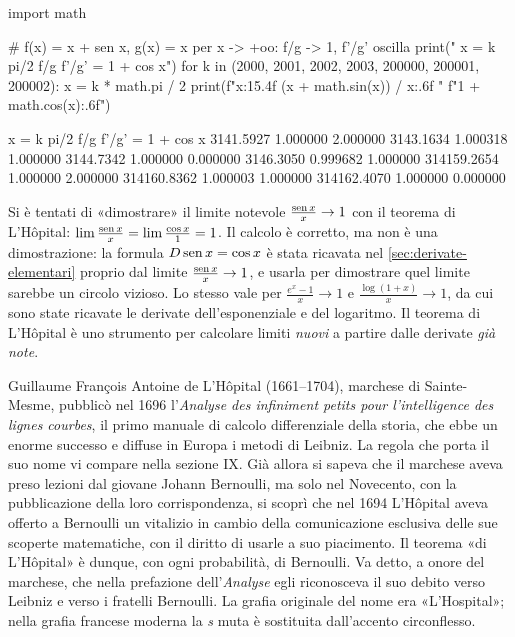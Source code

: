 \begin{python}
import math

# f(x) = x + sen x, g(x) = x per x -> +oo: f/g -> 1, f'/g' oscilla
print("     x = k pi/2        f/g     f'/g' = 1 + cos x")
for k in (2000, 2001, 2002, 2003, 200000, 200001, 200002):
    x = k * math.pi / 2
    print(f"{x:15.4f}   {(x + math.sin(x)) / x:.6f}   "
          f"{1 + math.cos(x):.6f}")
\end{python}
\begin{risultato}
     x = k pi/2        f/g     f'/g' = 1 + cos x
      3141.5927   1.000000   2.000000
      3143.1634   1.000318   1.000000
      3144.7342   1.000000   0.000000
      3146.3050   0.999682   1.000000
    314159.2654   1.000000   2.000000
    314160.8362   1.000003   1.000000
    314162.4070   1.000000   0.000000
\end{risultato}

\begin{attenzione}
Si è tentati di «dimostrare» il limite notevole $\frac{\operatorname{sen} x}{x}\to1$ con il teorema di
L'Hôpital: $\lim\frac{\operatorname{sen} x}{x}=\lim\frac{\cos x}{1}=1$. Il calcolo è corretto, ma non è
una dimostrazione: la formula $D\operatorname{sen} x=\cos x$ è stata ricavata nel
\cref{sec:derivate-elementari} proprio dal limite $\frac{\operatorname{sen} x}x\to1$, e usarla per
dimostrare quel limite sarebbe un circolo vizioso. Lo stesso vale per
$\frac{e^{x}-1}{x}\to1$ e $\frac{\log(1+x)}{x}\to1$, da cui sono state ricavate le
derivate dell'esponenziale e del logaritmo. Il teorema di L'Hôpital è uno strumento per
calcolare limiti \emph{nuovi} a partire dalle derivate \emph{già note}.
\end{attenzione}

\begin{notastorica}
Guillaume François Antoine de L'Hôpital (1661--1704), marchese di Sainte-Mesme,
pubblicò nel 1696 l'\emph{Analyse des infiniment petits pour l'intelligence des lignes
courbes}, il primo manuale di calcolo differenziale della storia, che ebbe un enorme
successo e diffuse in Europa i metodi di Leibniz. La regola che porta il suo nome vi
compare nella sezione IX. Già allora si sapeva che il marchese aveva preso lezioni dal
giovane Johann Bernoulli, ma solo nel Novecento, con la pubblicazione della loro
corrispondenza, si scoprì che nel 1694 L'Hôpital aveva offerto a Bernoulli un vitalizio
in cambio della comunicazione esclusiva delle sue scoperte matematiche, con il diritto di
usarle a suo piacimento. Il teorema «di L'Hôpital» è dunque, con ogni probabilità, di
Bernoulli. Va detto, a onore del marchese, che nella prefazione dell'\emph{Analyse} egli
riconosceva il suo debito verso Leibniz e verso i fratelli Bernoulli. La grafia
originale del nome era «L'Hospital»; nella grafia francese moderna la \emph{s} muta è
sostituita dall'accento circonflesso.
\end{notastorica}
